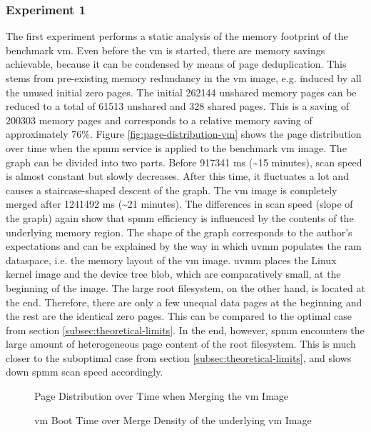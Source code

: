 \subsubsection*{Experiment 1}
\label{subsubsec:ex1}

The first experiment performs a static analysis of the memory footprint of the benchmark \ac{vm}.
Even before the \ac{vm} is started, there are memory savings achievable, because it can be condensed by means of page deduplication.
This stems from pre-existing memory redundancy in the \ac{vm} image, e.g. induced by all the unused initial zero pages.
The initial 262144 unshared memory pages can be reduced to a total of 61513 unshared and 328 shared pages.
This is a saving of 200303 memory pages and corresponds to a relative memory saving of approximately 76\%.
Figure \ref{fig:page-distribution-vm} shows the page distribution over time when the \ac{spmm} service is applied to the benchmark \ac{vm} image.
The graph can be divided into two parts.
Before 917341 ms (\textasciitilde{}15 minutes), scan speed is almost constant but slowly decreases.
After this time, it fluctuates a lot and causes a staircase-shaped descent of the graph.
The \ac{vm} image is completely merged after 1241492 ms (\textasciitilde{}21 minutes).
The differences in scan speed (slope of the graph) again show that \ac{spmm} efficiency is influenced by the contents of the underlying memory region.
The shape of the graph corresponds to the author's expectations and can be explained by the way in which \ac{uvmm} populates the \ac{ram} dataspace, i.e. the memory layout of the \ac{vm} image.
\Ac{uvmm} places the Linux kernel image and the device tree blob, which are comparatively small, at the beginning of the image.
The large root filesystem, on the other hand, is located at the end.
Therefore, there are only a few unequal data pages at the beginning and the rest are the identical zero pages.
This can be compared to the optimal case from section \ref{subsec:theoretical-limits}.
In the end, however, \ac{spmm} encounters the large amount of heterogeneous page content of the root filesystem.
This is much closer to the suboptimal case from section \ref{subsec:theoretical-limits}, and slows down \ac{spmm} scan speed accordingly.

\begin{figure}
  \centering
  
  \caption{Page Distribution over Time when Merging the \acs{vm} Image}
  \label{fig:page-distribution-vm}
  \centering
  
  \caption{\acs{vm} Boot Time over Merge Density of the underlying \ac{vm} Image}
  \label{fig:boot-time-vm}
\end{figure}

